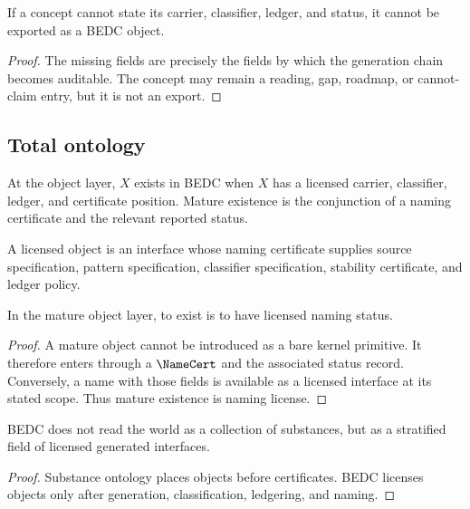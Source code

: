 \begin{corollary}
\label{cor:philosophy-no-position-no-export}
If a concept cannot state its carrier, classifier, ledger, and status,
it cannot be exported as a BEDC object.
\end{corollary}
\begin{proof}
The missing fields are precisely the fields by which the generation
chain becomes auditable. The concept may remain a reading, gap,
roadmap, or cannot-claim entry, but it is not an export.
\end{proof}

\subsection{Total ontology}
\label{subsec:philosophy-total-ontology}

\begin{definition}
\label{def:philosophy-bedc-existence}
At the object layer, \(X\) exists in BEDC when \(X\) has a licensed
carrier, classifier, ledger, and certificate position. Mature existence
is the conjunction of a naming certificate and the relevant reported
status.
\end{definition}

\begin{definition}
\label{def:philosophy-licensed-object-total}
A licensed object is an interface whose naming certificate supplies
source specification, pattern specification, classifier specification,
stability certificate, and ledger policy.
\end{definition}

\begin{theorem}
\label{thm:philosophy-mature-existence-naming-license}
In the mature object layer, to exist is to have licensed naming status.
\end{theorem}
\begin{proof}
A mature object cannot be introduced as a bare kernel primitive. It
therefore enters through a \(\NameCert\) and the associated status
record. Conversely, a name with those fields is available as a licensed
interface at its stated scope. Thus mature existence is naming license.
\end{proof}

\begin{corollary}
\label{cor:philosophy-anti-substance-ontology}
BEDC does not read the world as a collection of substances, but as a
stratified field of licensed generated interfaces.
\end{corollary}
\begin{proof}
Substance ontology places objects before certificates. BEDC licenses
objects only after generation, classification, ledgering, and naming.
\end{proof}


